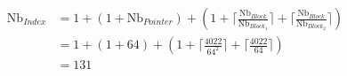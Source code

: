 \begin{align*}
    \text{Nb}_{Index} &= 1 + (1+\text{Nb}_{Pointer}) + (1+\lceil \frac{\text{Nb}_{Block}}{\text{Nb}_{Block_1}} \rceil + \lceil \frac{\text{Nb}_{Block}}{\text{Nb}_{Block_2}} \rceil )\\[0.15cm]
                      &= 1+(1+64)+(1+\lceil\frac{4022}{64^2}\rceil+\lceil\frac{4022}{64}\rceil)\\[0.15cm]
                      &=\boxed{131}
\end{align*}
